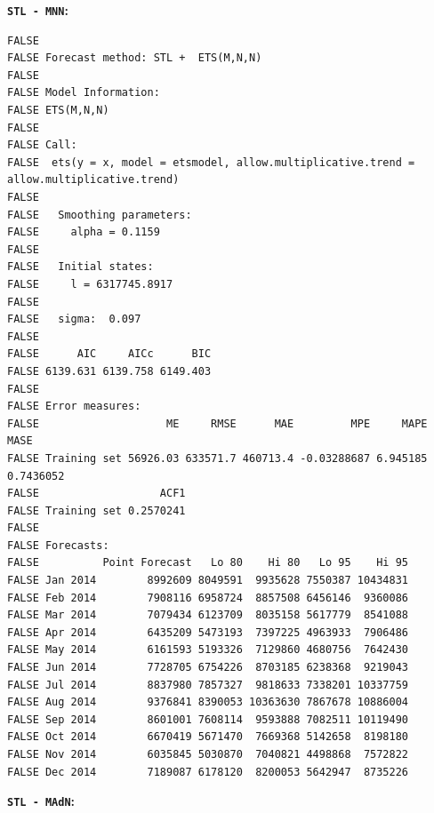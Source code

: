 \documentclass[openany]{book}
\begin{document}
\textbf{\texttt{STL\ -\ MNN}:}

\begin{verbatim}
FALSE 
FALSE Forecast method: STL +  ETS(M,N,N)
FALSE 
FALSE Model Information:
FALSE ETS(M,N,N) 
FALSE 
FALSE Call:
FALSE  ets(y = x, model = etsmodel, allow.multiplicative.trend = allow.multiplicative.trend) 
FALSE 
FALSE   Smoothing parameters:
FALSE     alpha = 0.1159 
FALSE 
FALSE   Initial states:
FALSE     l = 6317745.8917 
FALSE 
FALSE   sigma:  0.097
FALSE 
FALSE      AIC     AICc      BIC 
FALSE 6139.631 6139.758 6149.403 
FALSE 
FALSE Error measures:
FALSE                    ME     RMSE      MAE         MPE     MAPE      MASE
FALSE Training set 56926.03 633571.7 460713.4 -0.03288687 6.945185 0.7436052
FALSE                   ACF1
FALSE Training set 0.2570241
FALSE 
FALSE Forecasts:
FALSE          Point Forecast   Lo 80    Hi 80   Lo 95    Hi 95
FALSE Jan 2014        8992609 8049591  9935628 7550387 10434831
FALSE Feb 2014        7908116 6958724  8857508 6456146  9360086
FALSE Mar 2014        7079434 6123709  8035158 5617779  8541088
FALSE Apr 2014        6435209 5473193  7397225 4963933  7906486
FALSE May 2014        6161593 5193326  7129860 4680756  7642430
FALSE Jun 2014        7728705 6754226  8703185 6238368  9219043
FALSE Jul 2014        8837980 7857327  9818633 7338201 10337759
FALSE Aug 2014        9376841 8390053 10363630 7867678 10886004
FALSE Sep 2014        8601001 7608114  9593888 7082511 10119490
FALSE Oct 2014        6670419 5671470  7669368 5142658  8198180
FALSE Nov 2014        6035845 5030870  7040821 4498868  7572822
FALSE Dec 2014        7189087 6178120  8200053 5642947  8735226
\end{verbatim}

\textbf{\texttt{STL\ -\ MAdN}:}
\end{document}
